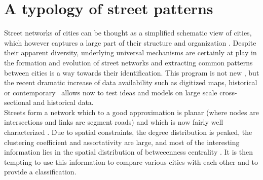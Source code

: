 \chapter{A typology of street patterns}
\label{chap:typology}


Street networks of cities can be thought as a simplified schematic view of
cities, which however captures a large part of their structure and organization
\cite{Southworth:2003}.  Despite their apparent diversity, underlying universal
mechanisms are certainly at play in the formation and evolution of street
networks and extracting common patterns between cities is a way towards their
identification. This program is not new \cite{Haggett:1969}, but the
recent dramatic increase  of data availability such as digitized maps,
historical or
contemporary~\cite{Strano:2012,Barthelemy:2013,Porta:2014} allows now to test
ideas and models on large scale cross-sectional and historical data.\\

Streets form a network which to a good approximation is planar (where nodes are
intersections and links are segment roads) and which is now fairly well
characterized
\cite{Jiang:2004,Rosvall:2005,Porta:2006,Porta:2006b,Lammer:2006,Crucitti:2006,Cardillo:2006,Xie:2007,Jiang:2007,Masucci:2009,Chan:2011,Courtat:2011}.
Due to spatial constraints, the degree distribution is peaked, the clustering
coefficient and assortativity are large, and most of the interesting information
lies in the spatial distribution of betweeenness centrality
\cite{Barthelemy:2011}. It is then tempting to use this information to compare
various cities with each other and to provide a classification. \\

